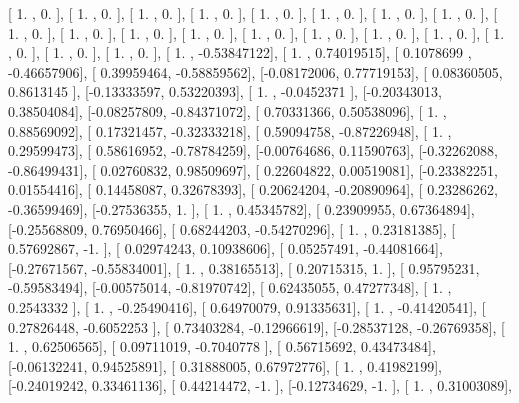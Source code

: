 \documentclass{article}
\begin{document}
       [ 1.        ,  0.        ],
       [ 1.        ,  0.        ],
       [ 1.        ,  0.        ],
       [ 1.        ,  0.        ],
       [ 1.        ,  0.        ],
       [ 1.        ,  0.        ],
       [ 1.        ,  0.        ],
       [ 1.        ,  0.        ],
       [ 1.        ,  0.        ],
       [ 1.        ,  0.        ],
       [ 1.        ,  0.        ],
       [ 1.        ,  0.        ],
       [ 1.        ,  0.        ],
       [ 1.        ,  0.        ],
       [ 1.        ,  0.        ],
       [ 1.        ,  0.        ],
       [ 1.        ,  0.        ],
       [ 1.        ,  0.        ],
       [ 1.        ,  0.        ],
       [ 1.        , -0.53847122],
       [ 1.        ,  0.74019515],
       [ 0.1078699 , -0.46657906],
       [ 0.39959464, -0.58859562],
       [-0.08172006,  0.77719153],
       [ 0.08360505,  0.8613145 ],
       [-0.13333597,  0.53220393],
       [ 1.        , -0.0452371 ],
       [-0.20343013,  0.38504084],
       [-0.08257809, -0.84371072],
       [ 0.70331366,  0.50538096],
       [ 1.        ,  0.88569092],
       [ 0.17321457, -0.32333218],
       [ 0.59094758, -0.87226948],
       [ 1.        ,  0.29599473],
       [ 0.58616952, -0.78784259],
       [-0.00764686,  0.11590763],
       [-0.32262088, -0.86499431],
       [ 0.02760832,  0.98509697],
       [ 0.22604822,  0.00519081],
       [-0.23382251,  0.01554416],
       [ 0.14458087,  0.32678393],
       [ 0.20624204, -0.20890964],
       [ 0.23286262, -0.36599469],
       [-0.27536355,  1.        ],
       [ 1.        ,  0.45345782],
       [ 0.23909955,  0.67364894],
       [-0.25568809,  0.76950466],
       [ 0.68244203, -0.54270296],
       [ 1.        ,  0.23181385],
       [ 0.57692867, -1.        ],
       [ 0.02974243,  0.10938606],
       [ 0.05257491, -0.44081664],
       [-0.27671567, -0.55834001],
       [ 1.        ,  0.38165513],
       [ 0.20715315,  1.        ],
       [ 0.95795231, -0.59583494],
       [-0.00575014, -0.81970742],
       [ 0.62435055,  0.47277348],
       [ 1.        ,  0.2543332 ],
       [ 1.        , -0.25490416],
       [ 0.64970079,  0.91335631],
       [ 1.        , -0.41420541],
       [ 0.27826448, -0.6052253 ],
       [ 0.73403284, -0.12966619],
       [-0.28537128, -0.26769358],
       [ 1.        ,  0.62506565],
       [ 0.09711019, -0.7040778 ],
       [ 0.56715692,  0.43473484],
       [-0.06132241,  0.94525891],
       [ 0.31888005,  0.67972776],
       [ 1.        ,  0.41982199],
       [-0.24019242,  0.33461136],
       [ 0.44214472, -1.        ],
       [-0.12734629, -1.        ],
       [ 1.        ,  0.31003089],
\end{document}
